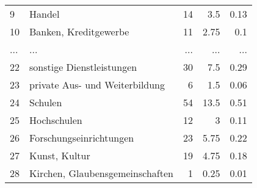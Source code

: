 \begin{longtable}{lXrrr}
        9 & \multicolumn{1}{X}{Handel} & %
          \num{14} &
          \num[round-mode=places,round-precision=2]{3.5} &
          \num[round-mode=places,round-precision=2]{0.13} \\
        10 & \multicolumn{1}{X}{Banken, Kreditgewerbe} & %
          \num{11} &
          \num[round-mode=places,round-precision=2]{2.75} &
          \num[round-mode=places,round-precision=2]{0.1} \\
       ... & ... & ... & ... & ... \\
        22 & \multicolumn{1}{X}{sonstige Dienstleistungen} & %
          \num{30} &
          \num[round-mode=places,round-precision=2]{7.5} &
          \num[round-mode=places,round-precision=2]{0.29} \\

        23 & \multicolumn{1}{X}{private Aus- und Weiterbildung} & %
          \num{6} &
          \num[round-mode=places,round-precision=2]{1.5} &
          \num[round-mode=places,round-precision=2]{0.06} \\

        24 & \multicolumn{1}{X}{Schulen} & %
          \num{54} &
          \num[round-mode=places,round-precision=2]{13.5} &
          \num[round-mode=places,round-precision=2]{0.51} \\

        25 & \multicolumn{1}{X}{Hochschulen} & %
          \num{12} &
          \num[round-mode=places,round-precision=2]{3} &
          \num[round-mode=places,round-precision=2]{0.11} \\

        26 & \multicolumn{1}{X}{Forschungseinrichtungen} & %
          \num{23} &
          \num[round-mode=places,round-precision=2]{5.75} &
          \num[round-mode=places,round-precision=2]{0.22} \\

        27 & \multicolumn{1}{X}{Kunst, Kultur} & %
          \num{19} &
          \num[round-mode=places,round-precision=2]{4.75} &
          \num[round-mode=places,round-precision=2]{0.18} \\

        28 & \multicolumn{1}{X}{Kirchen, Glaubensgemeinschaften} & %
          \num{1} &
          \num[round-mode=places,round-precision=2]{0.25} &
          \num[round-mode=places,round-precision=2]{0.01} \\


\end{longtable}
